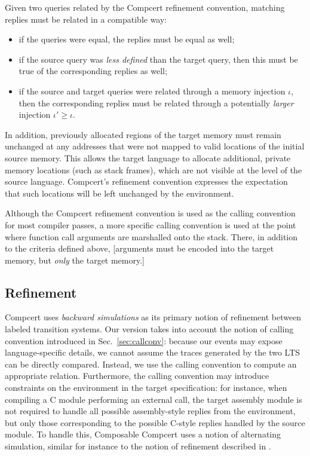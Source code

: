 Given two queries related by
the Compcert refinement convention,
matching replies
must be related in a compatible way:
\begin{itemize}
\item if the queries were equal,
  the replies must be equal as well;
\item if the source query was
  \emph{less defined} than the target query,
  then this must be true of the corresponding
  replies as well;
\item if the source and target queries
  were related through a memory injection $\iota$,
  then the corresponding replies
  must be related through a potentially \emph{larger}
  injection $\iota' \ge \iota$.
\end{itemize}
In addition,
previously allocated regions of the target memory
must remain unchanged
at any addresses that were not mapped to valid locations
of the initial source memory.
This allows the target language to allocate additional,
private memory locations (such as stack frames),
which are not visible at the level of the source language.
Compcert's refinement convention
expresses the expectation that such locations
will be left unchanged by the environment.

Although the Compcert refinement convention is used as
the calling convention for most compiler passes,
a more specific calling convention is used
at the point where function call arguments
are marshalled onto the stack.
There,
in addition to the criteria defined above,
[arguments must be encoded into the target memory,
but \emph{only} the target memory.]


\subsection{Refinement} %

Compcert uses \emph{backward simulations}
as its primary notion of refinement between labeled transition systems.
Our version takes into account the notion of calling convention
introduced in Sec.~\ref{sec:callconv}:
because our events may expose language-specific details,
we cannot assume the traces generated by the two LTS can be directly compared.
Instead,
we use the calling convention to compute an appropriate relation.
Furthermore,
the calling convention may introduce
constraints on the environment in the target specification:
for instance,
when compiling a C module performing an external call,
the target assembly module is not required to handle
all possible assembly-style replies from the environment,
but only those corresponding to the possible C-style replies
handled by the source module.
To handle this,
Composable Compcert uses a notion of alternating simulation,
similar for instance to the notion of refinement
described in \cite{gmos}.

